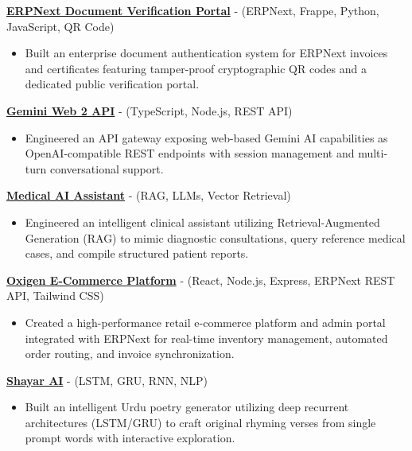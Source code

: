 \documentclass[11pt]{article}
\begin{document}
\href{https://github.com/usmanagro7c-eng/ERPNext-Document-Verification}{\textbf{ERPNext Document Verification Portal}} - (ERPNext, Frappe, Python, JavaScript, QR Code)  
\begin{itemize} 
  \item Built an enterprise document authentication system for ERPNext invoices and certificates featuring tamper-proof cryptographic QR codes and a dedicated public verification portal.
\end{itemize}

\href{https://github.com/usmanagro7c-eng/Gemini-Web-2-API}{\textbf{Gemini Web 2 API}} - (TypeScript, Node.js, REST API)  
\begin{itemize} 
  \item Engineered an API gateway exposing web-based Gemini AI capabilities as OpenAI-compatible REST endpoints with session management and multi-turn conversational support.
\end{itemize}

\href{https://github.com/MaAn-41/RAG-for-Diagnostic-Reasoning-for-Clinical-Notes}{\textbf{Medical AI Assistant}} - (RAG, LLMs, Vector Retrieval)  
\begin{itemize} 
  \item Engineered an intelligent clinical assistant utilizing Retrieval-Augmented Generation (RAG) to mimic diagnostic consultations, query reference medical cases, and compile structured patient reports.
\end{itemize}

\href{https://github.com/usmanagro7c-eng/Oxigen-Website}{\textbf{Oxigen E-Commerce Platform}} - (React, Node.js, Express, ERPNext REST API, Tailwind CSS)  
\begin{itemize} 
  \item Created a high-performance retail e-commerce platform and admin portal integrated with ERPNext for real-time inventory management, automated order routing, and invoice synchronization.
\end{itemize}

\href{https://github.com/MaAn-41/Shayar-AI}{\textbf{Shayar AI}} - (LSTM, GRU, RNN, NLP)  
\begin{itemize} 
  \item Built an intelligent Urdu poetry generator utilizing deep recurrent architectures (LSTM/GRU) to craft original rhyming verses from single prompt words with interactive exploration.
\end{itemize}
\end{document}
